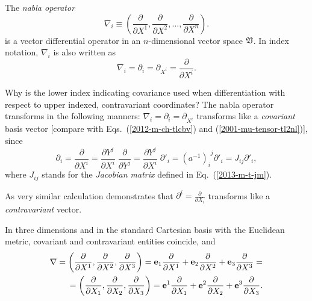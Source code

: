 The {\em nabla operator}
\begin{equation}
\nabla_i \equiv \left(
\frac{\partial }{\partial X^1},
\frac{\partial }{\partial X^2},
\ldots ,
\frac{\partial }{\partial X^n}
\right).
\end{equation}
is a vector differential operator in an $n$-dimensional vector space $\frak V$.
In index notation, $\nabla_i$ is also written as
\begin{equation}
\nabla_i  =\partial_i =\partial_{X^i}
= \frac{\partial }{\partial X^i}
.
\end{equation}

Why is the lower index indicating covariance used when differentiation with respect to upper indexed, contravariant coordinates?
The nabla operator transforms in the following manners:
$\nabla_i  =\partial_i =\partial_{X^i}$ transforms like a {\em covariant} basis vector
[compare with Eqs.~(\ref{2012-m-ch-tlcbv}) and (\ref{2001-mu-tensor-tl2nl})], since
\begin{equation}
\partial_i =
\frac{\partial }{\partial X^i}
=
\frac{\partial { Y }^j}{\partial X^i}
\;
\frac{\partial }{\partial { Y }^j}
=
\frac{\partial { Y }^j}{\partial X^i}
\;
\partial'_i
=
{{(a^{-1})}_i}^j
\partial'_i
=
J_{ij}
\partial'_i,
\end{equation}
where $J_{ij}$ stands for the {\em  Jacobian matrix} defined in Eq.~(\ref{2013-m-t-jm}).

As very similar calculation demonstrates that $\partial^i=\frac{\partial }{\partial X_i}$ transforms like a {\em contravariant} vector.


In three dimensions and in the standard Cartesian basis with the Euclidean metric,
covariant and contravariant entities coincide,
and
\begin{equation}
\begin{split}
\nabla
=
\left(
\frac{\partial }{\partial X^1},
\frac{\partial }{\partial X^2},
\frac{\partial }{\partial X^3}
\right)
={\bf e}_1\frac{\partial }{\partial X^1}
+{\bf e}_2\frac{\partial }{\partial X^2}
+{\bf e}_3\frac{\partial }{\partial X^3}
=
\\
= \left(
\frac{\partial }{\partial X_1},
\frac{\partial }{\partial X_2},
\frac{\partial }{\partial X_3}
\right)
={\bf e}^1\frac{\partial }{\partial X_1}
+{\bf e}^2\frac{\partial }{\partial X_2}
+{\bf e}^3\frac{\partial }{\partial X_3}
.
\end{split}
\end{equation}

